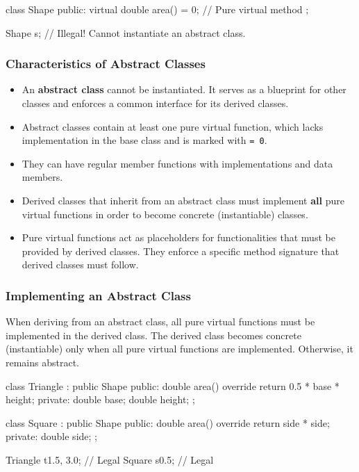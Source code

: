 \begin{codeblock}[language=C++]
class Shape {
public:
    virtual double area() = 0; // Pure virtual method
};

Shape s; // Illegal! Cannot instantiate an abstract class.
\end{codeblock}

\subsubsection{Characteristics of Abstract Classes}

\begin{itemize}
    \item An \textbf{abstract class} cannot be instantiated. It serves as a blueprint for other classes and enforces a common interface for its derived classes.
    \item Abstract classes contain at least one pure virtual function, which lacks implementation in the base class and is marked with \texttt{= 0}.
    \item They can have regular member functions with implementations and data members.
    \item Derived classes that inherit from an abstract class must implement \textbf{all} pure virtual functions in order to become concrete (instantiable) classes.
    \item Pure virtual functions act as placeholders for functionalities that must be provided by derived classes. They enforce a specific method signature that derived classes must follow.
\end{itemize}

\subsubsection{Implementing an Abstract Class}

When deriving from an abstract class, all pure virtual functions must be implemented in the derived class. The derived class becomes concrete (instantiable) only when all pure virtual functions are implemented. Otherwise, it remains abstract.

\begin{codeblock}[language=C++]
class Triangle : public Shape {
public:
    double area() override { return 0.5 * base * height; }
private:
    double base;
    double height;
};

class Square : public Shape {
public:
    double area() override { return side * side; }
private:
    double side;
};

Triangle t{1.5, 3.0};   // Legal
Square s{0.5};          // Legal
\end{codeblock}

